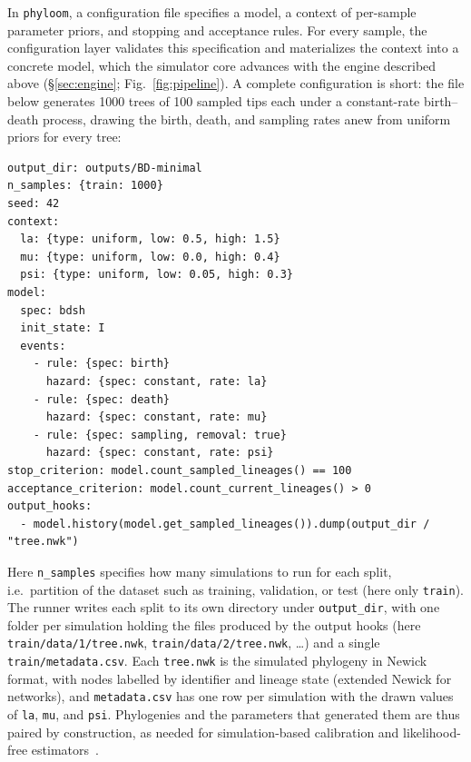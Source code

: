 \documentclass[11pt]{article}
\begin{document}
In \texttt{phyloom}, a configuration file specifies a model, a context of
per-sample parameter priors, and stopping and acceptance rules. For every
sample, the configuration layer validates this specification and materializes
the context into a concrete model, which the simulator core advances with the
engine described above (\S\ref{sec:engine}; Fig.~\ref{fig:pipeline}). A
complete configuration is short: the file below generates 1000 trees of 100
sampled tips each under a constant-rate birth--death process, drawing the
birth, death, and sampling rates anew from uniform priors for every tree:
\begin{lstlisting}[style=cfg]
output_dir: outputs/BD-minimal
n_samples: {train: 1000}
seed: 42
context:
  la: {type: uniform, low: 0.5, high: 1.5}
  mu: {type: uniform, low: 0.0, high: 0.4}
  psi: {type: uniform, low: 0.05, high: 0.3}
model:
  spec: bdsh
  init_state: I
  events:
    - rule: {spec: birth}
      hazard: {spec: constant, rate: la}
    - rule: {spec: death}
      hazard: {spec: constant, rate: mu}
    - rule: {spec: sampling, removal: true}
      hazard: {spec: constant, rate: psi}
stop_criterion: model.count_sampled_lineages() == 100
acceptance_criterion: model.count_current_lineages() > 0
output_hooks:
  - model.history(model.get_sampled_lineages()).dump(output_dir / "tree.nwk")
\end{lstlisting}

Here \texttt{n\_samples} specifies how many simulations to run for each split,
i.e.\ partition of the dataset such as training, validation, or test (here only
\texttt{train}). The runner writes each split to its own directory under
\texttt{output\_dir}, with one folder per simulation holding the files produced
by the output hooks (here \texttt{train/data/1/tree.nwk},
\texttt{train/data/2/tree.nwk}, \ldots) and a single
\texttt{train/metadata.csv}. Each \texttt{tree.nwk} is the simulated phylogeny in Newick format,
with nodes labelled by identifier and lineage state (extended Newick for
networks), and \texttt{metadata.csv} has one row per simulation with the drawn
values of \texttt{la}, \texttt{mu}, and \texttt{psi}. Phylogenies and the
parameters that generated them are thus paired by construction, as needed for
simulation-based calibration and likelihood-free
estimators~\citep{voznica2022phylodeep}.
\end{document}
